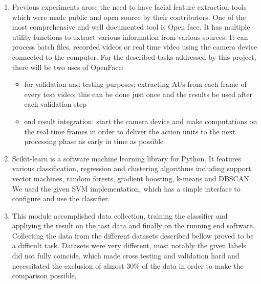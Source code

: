 \documentclass[runningheads,a4paper,11pt]{report}
\begin{document}
\begin{enumerate}
\item Previous experiments arose the need to have facial feature extraction tools which were made public and open source by their contributors. One of the most comprehensive and well documented tool is Open face. It has multiple utility functions to extract various information from various sources. It can process batch files, recorded videos or real time video using the camera device connected to the computer. For the described tasks addressed by this project, there will be two uses of OpenFace:
    \begin{itemize}
        \item for validation and testing purposes: extracting AUs from each frame of every test video; this can be done just once and the results be used after each validation step
        \item end result integration: start the camera device and make computations on the real time frames in order to deliver the action units to the next processing phase as early in time as possible
    \end{itemize}
\item Scikit-learn is a software machine learning library for Python. It features various classification, regression and clustering algorithms including support vector machines, random forests, gradient boosting, k-means and DBSCAN. We used the given SVM implementation, which has a simple interface to configure and use the classifier.
\item This module accomplished data collection, training the classifier and appliying the result on the tast data and finally on the running end software. Collecting the data from the different datasets described bellow proved to be a difficult task. Datasets were very different, most notably the given labels did not fully coincide, which made cross testing and validation hard and necessitated the exclusion of almost 30\% of the data in order to make the comparison possible. 
\end{enumerate}


\end{document}
